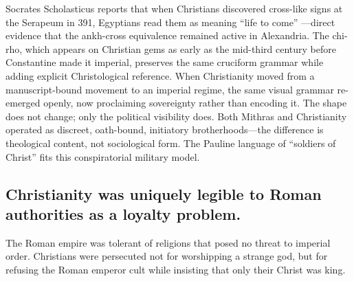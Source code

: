 Socrates Scholasticus reports that when Christians discovered cross-like signs at the Serapeum in 391, Egyptians read them as meaning ``life to come'' \cite[5.17]{socrates:he}---direct evidence that the ankh-cross equivalence remained active in Alexandria.
The chi-rho, which appears on Christian gems as early as the mid-third century before Constantine made it imperial, preserves the same cruciform grammar while adding explicit Christological reference.
When Christianity moved from a manuscript-bound movement to an imperial regime, the same visual grammar re-emerged openly, now proclaiming sovereignty rather than encoding it.
The shape does not change; only the political visibility does.
Both Mithras and Christianity operated as discreet, oath-bound, initiatory brotherhoods---the difference is theological content, not sociological form.
The Pauline language of ``soldiers of Christ'' fits this conspiratorial military model.

\subsection{Christianity was uniquely legible to Roman authorities as a loyalty problem.}\label{subsec:christianity-much-more-prosecuted-than-any-other-religion-in-the-roman-empire.}

The Roman empire was tolerant of religions that posed no threat to imperial order.
Christians were persecuted not for worshipping a strange god, but for refusing the Roman emperor cult while insisting that only their Christ was king.

